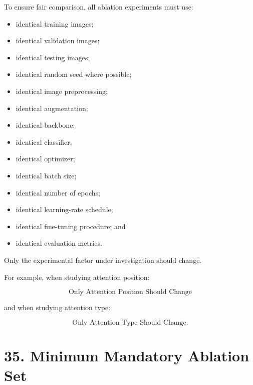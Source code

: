\documentclass[10pt]{article}
\begin{document}
To ensure fair comparison, all ablation experiments must use:

\begin{itemize}

\item identical training images;

\item identical validation images;

\item identical testing images;

\item identical random seed where possible;

\item identical image preprocessing;

\item identical augmentation;

\item identical backbone;

\item identical classifier;

\item identical optimizer;

\item identical batch size;

\item identical number of epochs;

\item identical learning-rate schedule;

\item identical fine-tuning procedure; and

\item identical evaluation metrics.

\end{itemize}

Only the experimental factor under investigation should change.

For example, when studying attention position:

\[
\boxed{
\text{Only Attention Position Should Change}
}
\]

and when studying attention type:

\[
\boxed{
\text{Only Attention Type Should Change}.
}
\]

\section*{35. Minimum Mandatory Ablation Set}
\end{document}
